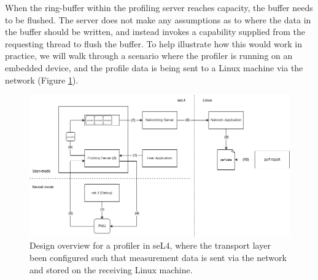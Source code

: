 When the ring-buffer within the profiling server reaches capacity, the buffer needs to be flushed. The server does not make any assumptions as to where the data in the buffer should be written, and instead invokes a capability supplied from the requesting thread to flush the buffer. To help illustrate how this would work in practice, we will walk through a scenario where the profiler is running on an embedded device, and the profile data is being sent to a Linux machine via the network (Figure \ref{fig:profiler_design}). 

\begin{figure}[!h]
    \includegraphics[width=\linewidth]{thesis_a_design_overview.drawio}
    \caption{Design overview for a profiler in seL4, where the transport layer been configured such that measurement data is sent via the network and stored on the receiving Linux machine.}
    \label{fig:profiler_design}
\end{figure}

